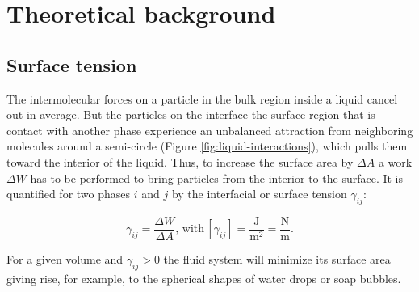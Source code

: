 \section{Theoretical background}

\subsection{Surface tension}

The intermolecular forces on a particle in the bulk region inside
a liquid cancel out in average. But the particles on the interface
\textendash{} the surface region that is contact with another phase
\textendash{} experience an unbalanced attraction from neighboring
molecules around a semi-circle (Figure \ref{fig:liquid-interactions}),
which pulls them toward the interior of the liquid. Thus, to increase
the surface area by $\Delta A$ a work $\varDelta W$ has to be performed
to bring particles from the interior to the surface. It is quantified
for two phases $i$ and $j$ by the interfacial or surface tension
$\gamma_{ij}$:

\begin{equation}

\gamma_{ij}=\frac{\varDelta W}{\varDelta A}\mathrm{,}\,\mathrm{with}\,[\gamma_{ij}]=\frac{\mathrm{J}}{\mathrm{m}^{2}}=\mathrm{\frac{N}{m}}.

\end{equation}

For a given volume and $\gamma_{ij}>0$ the fluid system will minimize
its surface area giving rise, for example, to the spherical shapes
of water drops or soap bubbles.